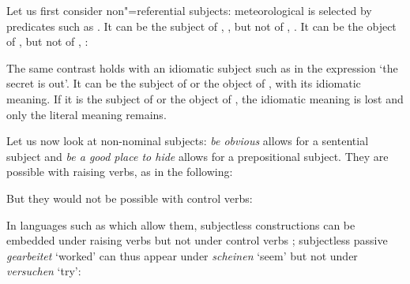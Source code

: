 Let us first consider non"=referential subjects: meteorological  is selected by predicates
such as . It can be the subject of , , but not of ,
. It can be the object of ,  but not of ,
:
	
\eal
{}
 \label{rain1}
 \label{rain2}
\zl
\eal
{} \label{rain3}
 \label{rain4}
\zl
 	
The same contrast holds with an idiomatic subject such as  in the expression  `the secret is out'. It can be the subject of  or the object of
, with its idiomatic meaning. If it is the subject of  or the object of
, the idiomatic meaning is lost and only the literal meaning remains. 
 
\eal
\judgewidth{\#}
 \label{cat1}
 \label{cat2}
 \label{cat3}
 \label{cat4}
\zl

Let us now look at non-nominal subjects: \emph{be obvious} allows for a sentential subject and
\emph{be a good place to hide} allows for a prepositional subject. They are possible with raising
verbs, as in the following: 
 
\eal 
{}
 \label{under}
\zl

\noindent
But they would not be possible with control verbs:
\eal
{}
\zl

In languages such as  which allow them, subjectless constructions can be embedded under
raising verbs but not under control verbs \citep[]{Mueller2002b}; subjectless passive
\emph{gearbeitet} `worked' can thus appear under \emph{scheinen} `seem' but not under
\emph{versuchen} `try': 

\eal
\label{german1}
\zl
 
